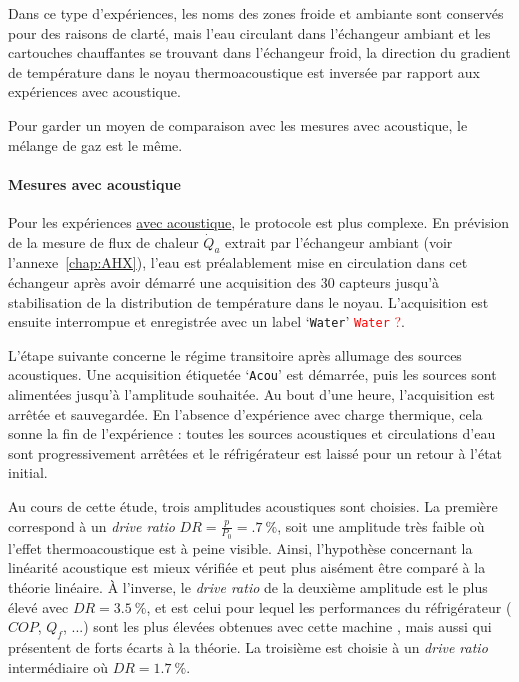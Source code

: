 Dans ce type d'expériences, les noms des zones \og froide \fg{} et \og ambiante \fg{} sont conservés pour des raisons de clarté, mais l'eau circulant dans l'échangeur ambiant et les cartouches chauffantes se trouvant dans l'échangeur froid, la direction du gradient de température dans le noyau thermoacoustique est inversée par rapport aux expériences avec acoustique. %

Pour garder un moyen de comparaison avec les mesures avec acoustique, le mélange de gaz est le même.

\paragraph{Mesures avec acoustique}\label{chap:MesureAvecAcou} Pour les expériences \underline{avec acoustique}, le protocole est plus complexe. En prévision de la mesure de flux de chaleur $\dot Q_a$ extrait par l'échangeur ambiant (voir l'annexe~\ref{chap:AHX}), l'eau est préalablement mise en circulation dans cet échangeur après avoir démarré une acquisition des 30 capteurs jusqu'à stabilisation de la distribution de température dans le noyau. L'acquisition est ensuite interrompue et enregistrée avec un label `\texttt{Water}' \textcolor{red}{\og \texttt{Water} \fg{} ?}.

L'étape suivante concerne le régime transitoire après allumage des sources acoustiques. Une acquisition étiquetée `\texttt{Acou}' est démarrée, puis les sources sont alimentées jusqu'à l'amplitude souhaitée. Au bout d'une heure, l'acquisition est arrêtée et sauvegardée. En l'absence d'expérience avec charge thermique, cela sonne la fin de l'expérience : toutes les sources acoustiques et circulations d'eau sont progressivement arrêtées et le réfrigérateur est laissé pour un retour à l'état initial. 

Au cours de cette étude, trois amplitudes acoustiques sont choisies. La première correspond à un \textit{drive ratio} $DR=\frac{p}{P_0}=\qty{.7}{\percent}$, soit une amplitude très faible où l'effet thermoacoustique est à peine visible. Ainsi, l'hypothèse concernant la linéarité acoustique est mieux vérifiée et peut plus aisément être comparé à la théorie linéaire. À l'inverse, le \textit{drive ratio} de la deuxième amplitude est le plus élevé avec $DR=\qty{3.5}{\percent}$, et est celui pour lequel les performances du réfrigérateur ($COP$, $Q_f$, ...) sont les plus élevées obtenues avec cette machine \cite{ramadan_design_2021}, mais aussi qui présentent de forts écarts à la théorie. La troisième est choisie à un \textit{drive ratio} intermédiaire où $DR=\qty{1.7}{\percent}$. 

